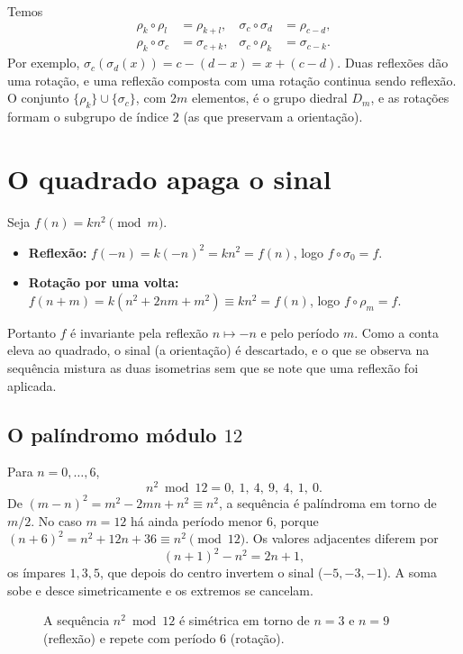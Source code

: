 \documentclass[12pt,a4paper]{article}
\theoremstyle{definition}
\begin{document}
Temos
\begin{align*}
\rho_k\circ\rho_l&=\rho_{k+l}, &
\sigma_c\circ\sigma_d&=\rho_{c-d},\\
\rho_k\circ\sigma_c&=\sigma_{c+k}, &
\sigma_c\circ\rho_k&=\sigma_{c-k}.
\end{align*}
Por exemplo, $\sigma_c(\sigma_d(x))=c-(d-x)=x+(c-d)$. Duas reflexões dão uma rotação, e uma reflexão composta com uma rotação continua sendo reflexão. O conjunto $\{\rho_k\}\cup\{\sigma_c\}$, com $2m$ elementos, é o grupo diedral $D_m$, e as rotações formam o subgrupo de índice $2$ (as que preservam a orientação).

\section{O quadrado apaga o sinal}

Seja $f(n)=kn^2 \pmod m$.
\begin{itemize}
\item \textbf{Reflexão:} $f(-n)=k(-n)^2=kn^2=f(n)$, logo $f\circ\sigma_0=f$.
\item \textbf{Rotação por uma volta:} $f(n+m)=k(n^2+2nm+m^2)\equiv kn^2=f(n)$, logo $f\circ\rho_m=f$.
\end{itemize}
Portanto $f$ é invariante pela reflexão $n\mapsto -n$ e pelo período $m$. Como a conta eleva ao quadrado, o sinal (a orientação) é descartado, e o que se observa na sequência mistura as duas isometrias sem que se note que uma reflexão foi aplicada.

\subsection*{O palíndromo módulo $12$}

Para $n=0,\dots,6$,
\[
n^2 \bmod 12 = 0,\ 1,\ 4,\ 9,\ 4,\ 1,\ 0.
\]
De $(m-n)^2=m^2-2mn+n^2\equiv n^2$, a sequência é palíndroma em torno de $m/2$. No caso $m=12$ há ainda período menor $6$, porque $(n+6)^2=n^2+12n+36\equiv n^2 \pmod{12}$. Os valores adjacentes diferem por
\[
(n+1)^2-n^2=2n+1,
\]
os ímpares $1,3,5$, que depois do centro invertem o sinal ($-5,-3,-1$). A soma sobe e desce simetricamente e os extremos se cancelam.

\begin{figure}[htbp]
\centering
{}
\caption{A sequência $n^2 \bmod 12$ é simétrica em torno de $n=3$ e $n=9$ (reflexão) e repete com período $6$ (rotação).}
\end{figure}
\end{document}
